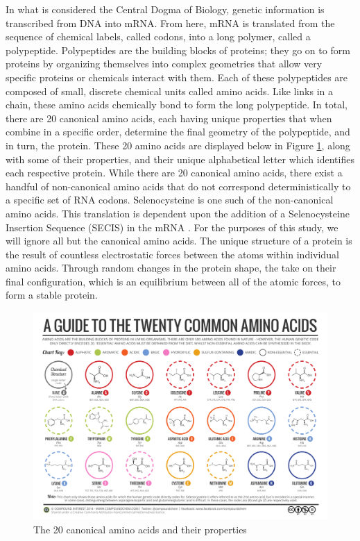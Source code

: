 \documentclass[pageno]{jpaper}
\begin{document}
\par
In what is considered the Central Dogma of Biology, genetic information is transcribed from DNA into mRNA.  From here, mRNA is translated from the sequence of chemical labels, called codons, into a long polymer, called a polypeptide.  Polypeptides are the building blocks of proteins; they go on to form proteins by organizing themselves into complex geometries that allow very specific proteins or chemicals interact with them.  Each of these polypeptides are composed of small, discrete chemical units called amino acids.  Like links in a chain, these amino acids chemically bond to form the long polypeptide.  In total, there are 20 canonical amino acids, each having unique properties that when combine in a specific order, determine the final geometry of the polypeptide, and in turn, the protein.  These 20 amino acids are displayed below in Figure \ref{fg:amino}, along with some of their properties, and their unique alphabetical letter which identifies each respective protein.  While there are 20 canonical amino acids, there exist a handful of non-canonical amino acids that do not correspond deterministically to a specific set of RNA codons.  Selenocysteine is one such of the non-canonical amino acids.  This translation is dependent upon the addition of a Selenocysteine Insertion Sequence (SECIS) in the mRNA \cite{longtin:2004}.  For the purposes of this study, we will ignore all but the canonical amino acids.  The unique structure of a protein is the result of countless electrostatic forces between the atoms within individual amino acids.  Through random changes in the protein shape, the take on their final configuration, which is an equilibrium between all of the atomic forces, to form a stable protein.

\begin{figure}[H]
	\centering
	\includegraphics[trim={35pt 0 35pt 0}, scale=0.42]{20-Common-Amino-Acids-v2.pdf}
	\caption{The 20 canonical amino acids and their properties \cite{brunning:2014}}
	\label{fg:amino}
\end{figure}
\end{document}
